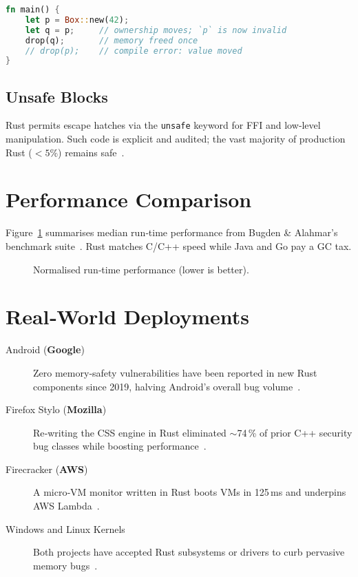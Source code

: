 \documentclass[11pt]{article}
\begin{document}
\begin{lstlisting}[language=Rust,caption={Ownership prevents double‑free},label={lst:rust_df}]
fn main() {
    let p = Box::new(42);
    let q = p;     // ownership moves; `p` is now invalid
    drop(q);       // memory freed once
    // drop(p);    // compile error: value moved
}
\end{lstlisting}

\subsection{Unsafe Blocks}
Rust permits escape hatches via the \texttt{unsafe} keyword for
FFI and low‑level manipulation.
Such code is explicit and audited; the vast majority of production
Rust (\(<\!5\%\)) remains safe~\cite{jung2018rustbelt}.

\section{Performance Comparison}
Figure~\ref{fig:perf} summarises median run‑time performance from
Bugden \& Alahmar’s benchmark suite~\cite{bugden2022study}.
Rust matches C/C++ speed while Java and Go pay a GC tax.

\begin{figure}[h]
    \centering
    \caption{Normalised run‑time performance (lower is better).}
    \label{fig:perf}
\end{figure}

\section{Real‑World Deployments}
\begin{description}
    \item[Android (\textbf{Google})] Zero memory‑safety
    vulnerabilities have been reported in new Rust components since 2019,
    halving Android’s overall bug volume~\cite{google2022androidReport}.
    \item[Firefox Stylo (\textbf{Mozilla})] Re‑writing the CSS engine
    in Rust eliminated \(\sim\)74\,\% of prior C++ security bug classes
    while boosting performance~\cite{mozilla2017stylo}.
    \item[Firecracker (\textbf{AWS})] A micro‑VM monitor written in Rust
    boots VMs in 125\,ms and underpins AWS Lambda~\cite{aws2019firecracker}.
    \item[Windows and Linux Kernels] Both projects have accepted Rust
    subsystems or drivers to curb pervasive memory bugs~\cite{msrc2019survey}.
\end{description}
\end{document}
